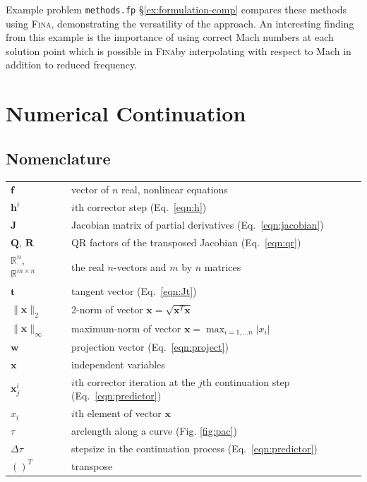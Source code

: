 \documentclass[10pt,openany,twoside]{book}
\numberwithin{equation}{section}   %
\newcommand{\Code}[1]{{\small\tt #1}}
\newcommand{\Fina}{{\normalfont\scshape Fina\:}}
\newcommand{\Matrix}[1]{\boldsymbol{#1}}
\newcommand{\Vector}[1]{\boldsymbol{#1}}
\newcommand{\Sectref}[1]{\S\ref{#1}}
\newcommand{\Eqn}[1]{Eq.\ \ref{#1}}
\newcommand{\Figref}[1]{Fig. \ref{#1}}
\newcommand{\Step}{\Delta\tau} %
\begin{document}
Example problem \Code{methods.fp} \Sectref{ex:formulation-comp}
compares these methods using \Fina,
demonstrating the versatility of the approach. An interesting finding from
this example is the importance of using correct Mach numbers at each solution
point which is possible in \Fina by interpolating with respect to Mach in
addition to reduced frequency.

\newpage
\chapter{Numerical Continuation}\label{chap:continuation}

\section{Nomenclature}\label{sect:pac-nomenclature}
\begin{small}
\noindent\begin{longtable}{@{}lcl@{}}
$\Vector{f}$ & & vector of $n$ real, nonlinear equations \\
$\Vector{h}^i$ & & $i\text{th}$ corrector step (\Eqn{eqn:h}) \\
$\Matrix{J}$ & & Jacobian matrix of partial derivatives (\Eqn{eqn:jacobian}) \\
$\Matrix{Q}$, $\Matrix{R}$ & & QR factors of the transposed Jacobian (\Eqn{eqn:qr}) \\
$\mathbb{R}^n$, $\mathbb{R}^{m \times n}$ & & the real $n$-vectors and $m$ by $n$ matrices \\
$\Vector{t}$ & & tangent vector (\Eqn{eqn:Jt}) \\
$\|\Vector{x}\|_2$ & & 2-norm of vector $\Vector{x} =
   \sqrt{\Vector{x}^T\Vector{x}}$ \index{2-norm!real}\\
$\|\Vector{x}\|_\infty$ & & maximum-norm of vector $\Vector{x} = {\displaystyle \max_{i=1,\ldots n} |x_i|}$ \\
$\Vector{w}$ & & projection vector (\Eqn{eqn:project}) \\
$\Vector{x}$ & & independent variables \\
$\Vector{x}_j^i$ & & $i\text{th}$ corrector iteration at the $j\text{th}$
   continuation step (\Eqn{eqn:predictor}) \\
$x_i$ & & $i\text{th}$ element of vector $\Vector{x}$ \\
$\tau$ & & arclength along a curve (\Figref{fig:pac}) \\
$\Step$ & & stepsize in the continuation process (\Eqn{eqn:predictor}) \\
$()^T$ & & transpose \\
\end{longtable}
\end{small}
\end{document}
